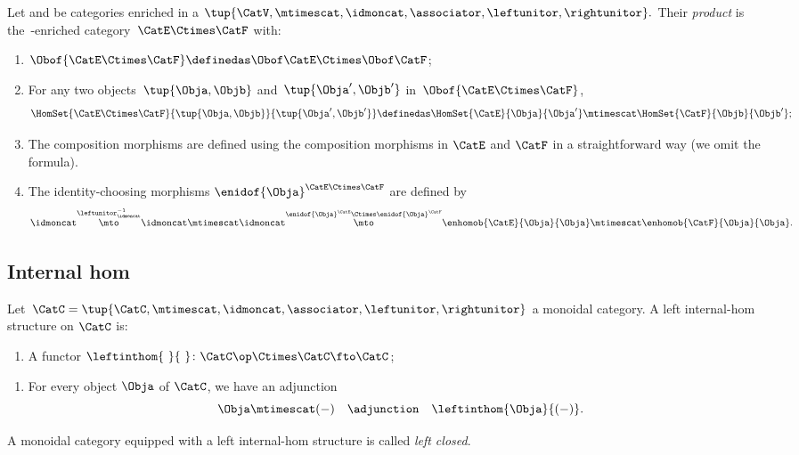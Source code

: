 \begin{ctdefinition}
    \label{def:prod_enriched_cat}
    Let \CatE and \CatF be categories enriched in a  $\tup{\CatV, \mtimescat, \idmoncat, \associator, \leftunitor, \rightunitor}.$
    Their \emph{product} is the~\CatV-enriched category~$\CatE\Ctimes \CatF$ with:
    \begin{enumerate}
        \item $\Obof{\CatE\Ctimes \CatF}\definedas \Obof\CatE \Ctimes \Obof\CatF$;
        \item For any two objects~$\tup{\Obja,\Objb}$ and~$\tup{\Obja',\Objb'}$ in~$\Obof{\CatE\Ctimes \CatF}$,
        \begin{equation}
\HomSet{\CatE\Ctimes \CatF}{\tup{\Obja,\Objb}}{\tup{\Obja',\Objb'}}\definedas \HomSet{\CatE}{\Obja}{\Obja'}\mtimescat \HomSet{\CatF}{\Objb}{\Objb'};
\end{equation}
\item The composition morphisms are defined using the composition morphisms in $\CatE$ and $\CatF$ in a straightforward way (we omit the formula). 
\item The identity-choosing morphisms $\enidof{\Obja}^{\CatE \Ctimes \CatF}$ are defined by
\begin{equation}
\idmoncat \overset{\leftunitor^{-1}_\idmoncat}{\mto} \idmoncat \mtimescat \idmoncat \overset{\enidof{\Obja}^{\CatE} \Ctimes \enidof{\Obja}^{\CatF}}{\mto} \enhomob{\CatE}{\Obja}{\Obja} \mtimescat \enhomob{\CatF}{\Obja}{\Obja}.
\end{equation}
\end{enumerate}
\end{ctdefinition}



\subsection{Internal hom}

\begin{ctdefinition}
\label{def:left-internal-hom}
Let~$\CatC = \tup{\CatC, \mtimescat, \idmoncat, \associator, \leftunitor, \rightunitor}$ a monoidal category. A left internal-hom structure on $\CatC$ is:

\constit
\begin{enumerate}
\item A functor $\leftinthom{\ }{\ } \colon \CatC\op \Ctimes \CatC \fto \CatC$; 
\end{enumerate}

\condit
\begin{enumerate}
\item For every object $\Obja$ of $\CatC$, we have an adjunction 
\begin{equation}
\Obja \mtimescat ( - ) \quad  \adjunction \quad \leftinthom{\Obja}{( - )}.
\end{equation}
\end{enumerate}
A monoidal category equipped with a left internal-hom structure is called \emph{left closed}.
\end{ctdefinition}

